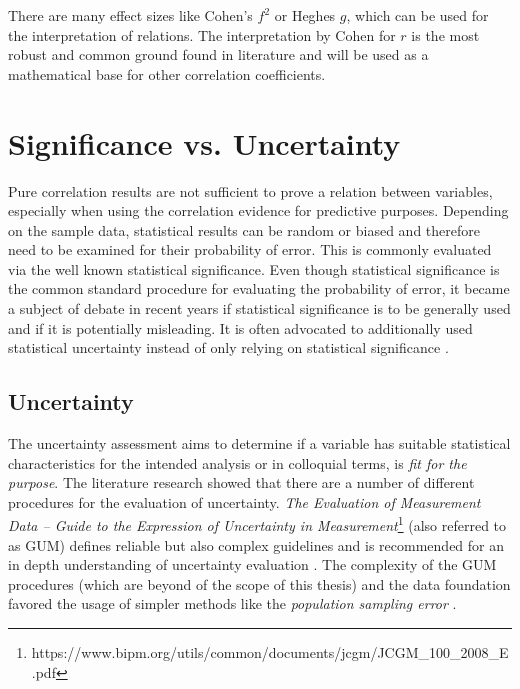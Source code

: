 
There are many effect sizes like Cohen's $f^2$ or Heghes $g$, which can be used for the interpretation of relations. The interpretation by Cohen for $r$ is the most robust and common ground found in literature and will be used as a mathematical base for other correlation coefficients.

\section{Significance vs. Uncertainty}
\label{correlation_significance_uncertainty}
Pure correlation results are not sufficient to prove a relation between variables, especially when using the correlation evidence for predictive purposes. Depending on the sample data, statistical results can be random or biased and therefore need to be examined for their probability of error. This is commonly evaluated via the well known statistical significance. Even though statistical significance is the common standard procedure for evaluating the probability of error, it became a subject of debate in recent years if statistical significance is to be generally used and if it is potentially misleading. It is often advocated to additionally used statistical uncertainty instead of only relying on statistical significance \parencite{Harris2019}.

\subsection{Uncertainty}
\label{correlation_uncertainty}
The uncertainty assessment aims to determine if a variable has suitable statistical characteristics for the intended analysis or in colloquial terms, is \textit{fit for the purpose}. The literature research showed that there are a number of different procedures for the evaluation of uncertainty. \textit{The Evaluation of Measurement Data -- Guide to the Expression of Uncertainty in Measurement}\footnote{https://www.bipm.org/utils/common/documents/jcgm/JCGM\_100\_2008\_E.pdf} (also referred to as GUM) defines reliable but also complex guidelines and is recommended for an in depth understanding of uncertainty evaluation \parencite{Farrance2012}. The complexity of the GUM procedures (which are beyond of the scope of this thesis) and the data foundation favored the usage of simpler methods like the \textit{population sampling error} \parencite{ONS2020}.


